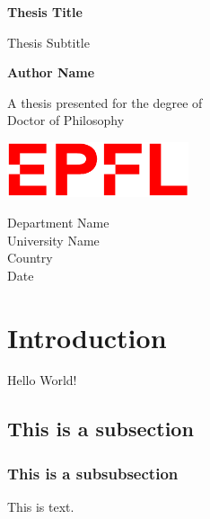 \documentclass{article}
\begin{document}


\begin{titlepage}
\begin{center}
\vspace*{1cm}

\textbf{Thesis Title}

\vspace{0.5cm}
Thesis Subtitle

\vspace{1.5cm}

\textbf{Author Name}

\vfill

A thesis presented for the degree of\\
Doctor of Philosophy

\vspace{0.8cm}

\includegraphics[width=0.4\textwidth]{epfl-clean.png}


Department Name\\
University Name\\
Country\\
Date

\end{center}
\end{titlepage}




\section{Introduction}
	Hello World!
	
	\subsection{This is a subsection}
		\subsubsection{This is a subsubsection}
			This is text.
\end{document}

